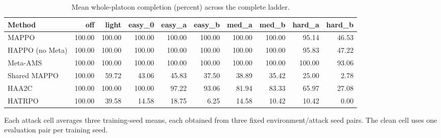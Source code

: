 \begin{table}[t]
\centering
\caption{Mean whole-platoon completion (percent) across the complete ladder.}
\label{tab:ladder}
\small
\setlength{\tabcolsep}{4pt}
\begin{tabular}{lrrrrrrrrr}
\toprule
Method & off & light & easy\_0 & easy\_a & easy\_b & med\_a & med\_b & hard\_a & hard\_b \\
\midrule
MAPPO & 100.00 & 100.00 & 100.00 & 100.00 & 100.00 & 100.00 & 100.00 & 95.14 & 46.53 \\
HAPPO (no Meta) & 100.00 & 100.00 & 100.00 & 100.00 & 100.00 & 100.00 & 100.00 & 95.83 & 47.22 \\
Meta-AMS & 100.00 & 100.00 & 100.00 & 100.00 & 100.00 & 100.00 & 100.00 & 100.00 & 93.06 \\
Shared MAPPO & 100.00 & 59.72 & 43.06 & 45.83 & 37.50 & 38.89 & 35.42 & 25.00 & 2.78 \\
HAA2C & 100.00 & 100.00 & 100.00 & 97.22 & 93.06 & 81.94 & 83.33 & 65.97 & 27.08 \\
HATRPO & 100.00 & 39.58 & 14.58 & 18.75 & 6.25 & 14.58 & 10.42 & 10.42 & 0.00 \\
\bottomrule
\end{tabular}

\vspace{2pt}\begin{minipage}{\linewidth}\footnotesize Each attack cell averages three training-seed means, each obtained from three fixed environment/attack seed pairs. The clean cell uses one evaluation pair per training seed.\end{minipage}
\end{table}
